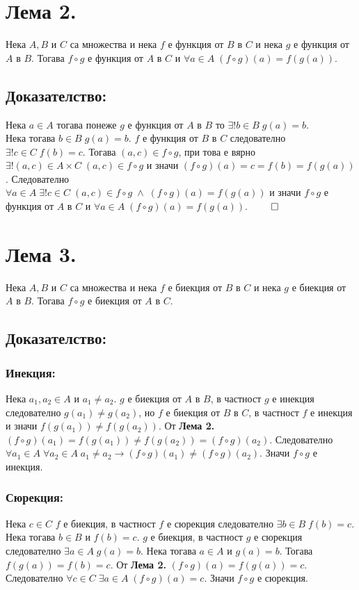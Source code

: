 \documentclass[a4paper, 12pt, oneside]{article}
\begin{document}
\section*{Лема 2.}
Нека \(A, B\) и \(C\) са множества
и нека \(f\) е функция от \(B\) в \(C\)
и нека \(g\) е функция от \(A\) в \(B\).
Тогава \(f \circ g\) е функция от \(A\) в \(C\) и \(\forall a \in A \; (f \circ g)(a) = f(g(a))\).
\subsection*{Доказателство:}
Нека \(a \in A\) тогава понеже \(g\) е функция от \(A\) в \(B\)
то \(\exists! b \in B \; g(a) = b\). \\
Нека тогава \(b \in B \; g(a) = b\).
\(f\) е функция от \(B\) в \(C\) следователно \(\exists! c \in C \; f(b) = c\).
Тогава \((a, c) \in f \circ g\),
при това е вярно \(\exists! (a, c) \in A \times C \; (a, c) \in f \circ g\)
и значи \((f \circ g)(a) = c = f(b) = f(g(a))\).
Следователно \\
\(\forall a \in A \; \exists! c \in C \; (a, c) \in f \circ g \; \land \; (f \circ g)(a) = f(g(a))\)
и значи \(f \circ g\) е функция от \(A\) в \(C\) и \(\forall a \in A \; (f \circ g)(a) = f(g(a))\). \(\qed\)
\section*{Лема 3.}
Нека \(A, B\) и \(C\) са множества
и нека \(f\) е биекция от \(B\) в \(C\)
и нека \(g\) е биекция от \(A\) в \(B\).
Тогава \(f \circ g\) е биекция от \(A\) в \(C\).
\subsection*{Доказателство:}
\subsubsection*{Инекция:}
Нека \(a_1, a_2 \in A\) и \(a_1 \neq a_2\).
\(g\) е биекция от \(A\) в \(B\), в частност \(g\) е инекция
следователно \(g(a_1) \neq g(a_2)\), но \(f\) е биекция от \(B\) в \(C\),
в частност \(f\) е инекция и значи \(f(g(a_1)) \neq f(g(a_2))\).
От \textbf{Лема 2.} \((f \circ g)(a_1) = f(g(a_1)) \neq f(g(a_2)) = (f \circ g)(a_2)\).
Следователно \(\forall a_1 \in A \; \forall a_2 \in A \; a_1 \neq a_2 \longrightarrow (f \circ g)(a_1) \neq (f \circ g)(a_2)\).
Значи \(f \circ g\) е инекция.
\subsubsection*{Сюрекция:}
Нека \(c \in C\) \(f\) е биекция, в частност \(f\) е сюрекция
следователно \(\exists b \in B \; f(b) = c\).
Нека тогава \(b \in B\) и \(f(b) = c\).
\(g\) е биекция, в частност \(g\) е сюрекция
следователно \(\exists a \in A \; g(a) = b\).
Нека тогава \(a \in A\) и \(g(a) = b\).
Тогава \(f(g(a)) = f(b) = c\).
От \textbf{Лема 2.} \((f \circ g)(a) = f(g(a)) = c\).
Следователно \(\forall c \in C \; \exists a \in A \; (f \circ g)(a) = c\).
Значи \(f \circ g\) е сюрекция.
\end{document}
